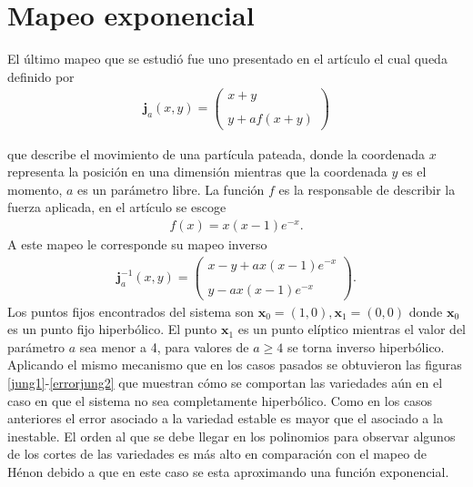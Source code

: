 \section{Mapeo exponencial}
El último mapeo que se estudió fue uno presentado en el artículo \citep{Jung} el cual queda definido por 
\begin{eqnarray}
\mathbf{j}_{a}(x,y)=\left(\begin{array}{lcc}
             x+y\\
             \\ y+af(x+y)
             \end{array}\right)
\label{Jung}
\end{eqnarray}

que describe el movimiento de una partícula pateada, donde la coordenada $x$ representa la posición en una dimensión mientras que la coordenada $y$ es el momento, $a$ es un parámetro libre. La función $f$ es la responsable de describir la fuerza aplicada, en el artículo \cite{Jung} se escoge
\begin{eqnarray*}
f(x)=x(x-1)e^{-x}.
\end{eqnarray*}
A este mapeo le corresponde su mapeo inverso
\begin{eqnarray}
\mathbf{j}^{-1}_{a}(x,y)=\left(\begin{array}{lcc}
             x-y+ax(x-1)e^{-x}\\
             \\ y-ax(x-1)e^{-x}
             \end{array}\right).
             \label{jungI}
\end{eqnarray}
Los puntos fijos encontrados del sistema son $\mathbf{x}_{0}=(1,0), \mathbf{x}_{1}=(0,0)$ donde $\mathbf{x}_{0}$ es un punto fijo hiperbólico. El punto $\mathbf{x}_{1}$ es un punto elíptico mientras el valor del parámetro $a$ sea menor a 4, para valores de $a \geq 4$ se torna inverso hiperbólico.\\

Aplicando el mismo mecanismo que en los casos pasados se obtuvieron las figuras \ref{jung1}-\ref{errorjung2} que muestran cómo se comportan las variedades aún en el caso en que el sistema no sea completamente hiperbólico. Como en los casos anteriores el error asociado a la variedad estable es mayor que el asociado a la inestable. El orden al que se debe llegar en los polinomios para observar algunos de los cortes de las variedades es más alto en comparación con el mapeo de Hénon debido a que en este caso se esta aproximando una función exponencial.

